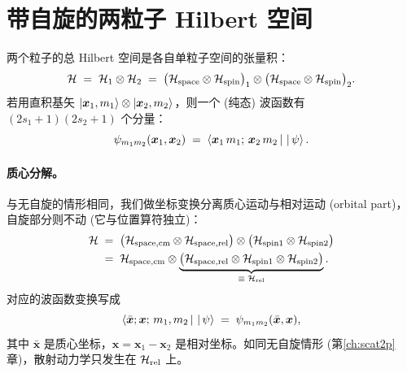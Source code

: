 \section{带自旋的两粒子 Hilbert 空间}\label{sec:2p-spin-hilbert}

两个粒子的总 Hilbert 空间是各自单粒子空间的张量积：
\begin{equation}
  \mathcal{H} \;=\; \mathcal{H}_1\otimes\mathcal{H}_2 \;=\; \bigl(\mathcal{H}_{\rm space}\otimes\mathcal{H}_{\rm spin}\bigr)_1\otimes\bigl(\mathcal{H}_{\rm space}\otimes\mathcal{H}_{\rm spin}\bigr)_2.
  \label{eq:2p-hilbert}
\end{equation}
若用直积基矢 $\ket{\bm x_1,m_1}\otimes\ket{\bm x_2,m_2}$，则一个 (纯态) 波函数有 $(2s_1+1)(2s_2+1)$ 个分量：
\begin{equation}
  \psi_{m_1 m_2}(\bm x_1,\bm x_2) \;=\; \left\langle \bm x_1\, m_1;\, \bm x_2\, m_2 \,\middle|\,  \,\middle|\, \psi \right\rangle.
  \label{eq:wavefunc-2p-spin}
\end{equation}

\paragraph{质心分解。}与无自旋的情形相同，我们做坐标变换分离质心运动与相对运动 (orbital part)，自旋部分则不动 (它与位置算符独立)：
\begin{equation}
  \begin{aligned}
    \mathcal{H} \;&=\; \bigl(\mathcal{H}_{\rm space,cm}\otimes\mathcal{H}_{\rm space,rel}\bigr)\otimes \bigl(\mathcal{H}_{\rm spin1}\otimes\mathcal{H}_{\rm spin2}\bigr) \\
           \;&=\; \mathcal{H}_{\rm space,cm}\otimes\underbrace{\bigl(\mathcal{H}_{\rm space,rel}\otimes\mathcal{H}_{\rm spin1}\otimes\mathcal{H}_{\rm spin2}\bigr)}_{\equiv\;\mathcal{H}_{\rm rel}}.
  \end{aligned}
  \label{eq:2p-decomp}
\end{equation}
对应的波函数变换写成
\begin{equation}
  \left\langle \bar{\bm x};\bm x;\,m_1,m_2 \,\middle|\,  \,\middle|\, \psi \right\rangle \;=\; \psi_{m_1 m_2}(\bar{\bm x},\bm x),
\end{equation}
其中 $\bar{\bm x}$ 是质心坐标，$\bm x=\bm x_1-\bm x_2$ 是相对坐标。如同无自旋情形 (第\ref{ch:scat2p}章)，散射动力学只发生在 $\mathcal{H}_{\rm rel}$ 上。

